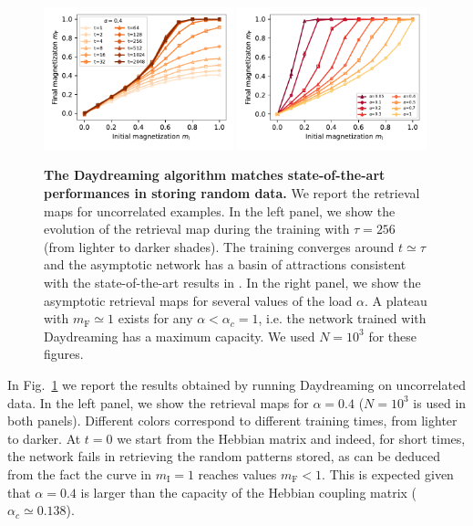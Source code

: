 \documentclass[a4paper]{cas-sc}
\begin{document}
\begin{figure}[t]
\centering
\includegraphics[width=0.49\textwidth]{fig2a}
\includegraphics[width=0.49\textwidth]{fig2b}
\caption{ 
\textbf{The Daydreaming algorithm matches state-of-the-art performances in storing random data.} 
We report the retrieval maps for uncorrelated examples. In the left panel, we show the evolution of the retrieval map during the training with $\tau=256$ (from lighter to darker shades). The training converges around $t \simeq \tau$ and the asymptotic network has a basin of attractions consistent with the state-of-the-art results in \cite{benedetti2022supervised}. In the right panel, we show the asymptotic retrieval maps for several values of the load $\alpha$. A plateau with $m_\text{F}\simeq1$ exists for any $\alpha<\alpha_c=1$, i.e. the network trained with Daydreaming has a maximum capacity. We used $N=10^3$ for these figures.}
\label{fig:results_uncorr}
\end{figure}

In Fig.~\ref{fig:results_uncorr} we report the results obtained by running Daydreaming on uncorrelated data. In the left panel, we show the retrieval maps for $\alpha=0.4$ ($N=10^3$ is used in both panels). Different colors correspond to different training times, from lighter to darker.
At $t=0$ we start from the Hebbian matrix and indeed, for short times, the network fails in retrieving the random patterns stored, as can be deduced from the fact the curve in $m_\text{I}=1$ reaches values $m_\text{F}<1$.
This is expected given that $\alpha=0.4$ is larger than the capacity of the Hebbian coupling matrix ($\alpha_c\simeq0.138$).
\end{document}

